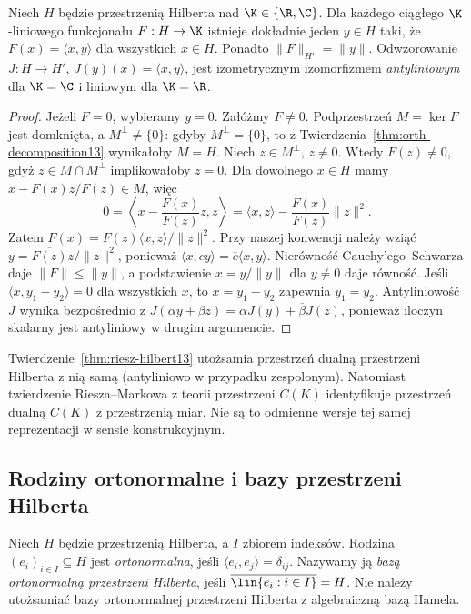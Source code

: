 \begin{twierdzenie}
\label{thm:riesz-hilbert13}
Niech $H$ będzie przestrzenią Hilberta nad $\K\in\{\R,\C\}$.
Dla każdego ciągłego $\K$-liniowego funkcjonału $F:H\to\K$
istnieje dokładnie jeden $y\in H$ taki, że
$F(x)=\langle x,y\rangle$ dla wszystkich $x\in H$.
Ponadto $\|F\|_{H'}=\|y\|$.
Odwzorowanie $J:H\to H'$, $J(y)(x)=\langle x,y\rangle$,
jest izometrycznym izomorfizmem \emph{antyliniowym} dla $\K=\C$
i liniowym dla $\K=\R$.
\end{twierdzenie}
\begin{proof}
Jeżeli $F=0$, wybieramy $y=0$. Załóżmy $F\ne0$.
Podprzestrzeń $M=\ker F$ jest domknięta, a $M^\perp\ne\{0\}$:
gdyby $M^\perp=\{0\}$, to z Twierdzenia~\ref{thm:orth-decomposition13}
wynikałoby $M=H$.
Niech $z\in M^\perp$, $z\ne0$. Wtedy $F(z)\ne0$, gdyż
$z\in M\cap M^\perp$ implikowałoby $z=0$.
Dla dowolnego $x\in H$ mamy
$x-F(x)z/F(z)\in M$, więc
\[
0=\left\langle x-\frac{F(x)}{F(z)}z,z\right\rangle
=\langle x,z\rangle-\frac{F(x)}{F(z)}\|z\|^2.
\]
Zatem $F(x)=F(z)\langle x,z\rangle/\|z\|^2$.
Przy naszej konwencji należy wziąć
$y=\overline{F(z)}z/\|z\|^2$, ponieważ
$\langle x,cy\rangle=\overline c\langle x,y\rangle$.
Nierówność Cauchy'ego--Schwarza daje $\|F\|\le\|y\|$,
a podstawienie $x=y/\|y\|$ dla $y\ne0$ daje równość.
Jeśli $\langle x,y_1-y_2\rangle=0$ dla wszystkich $x$, to
$x=y_1-y_2$ zapewnia $y_1=y_2$. Antyliniowość $J$
wynika bezpośrednio z $J(\alpha y+\beta z)
=\overline\alpha J(y)+\overline\beta J(z)$, ponieważ
iloczyn skalarny jest antyliniowy w drugim argumencie.
\end{proof}

\begin{uwaga}
\label{rem:two-riesz13}
Twierdzenie~\ref{thm:riesz-hilbert13} utożsamia przestrzeń dualną
przestrzeni Hilberta z nią samą (antyliniowo w przypadku zespolonym).
Natomiast twierdzenie Riesza--Markowa z teorii przestrzeni $C(K)$ identyfikuje
przestrzeń dualną $C(K)$ z przestrzenią miar. Nie są to
odmienne wersje tej samej reprezentacji w sensie konstrukcyjnym.
\end{uwaga}

\subsection{Rodziny ortonormalne i bazy przestrzeni Hilberta}

\begin{definicja}
\label{def:on-basis13}
Niech $H$ będzie przestrzenią Hilberta, a $I$ zbiorem indeksów.
Rodzina $(e_i)_{i\in I}\subseteq H$ jest \emph{ortonormalna}, jeśli
$\langle e_i,e_j\rangle=\delta_{ij}$.
Nazywamy ją \emph{bazą ortonormalną przestrzeni Hilberta}, jeśli
$\overline{\lin\{e_i:i\in I\}}=H$.
Nie należy utożsamiać bazy ortonormalnej przestrzeni Hilberta z algebraiczną bazą Hamela.
\end{definicja}

